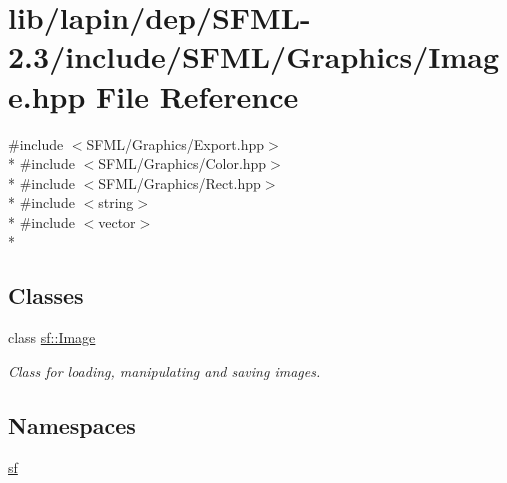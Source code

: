 \hypertarget{lapin_2dep_2_s_f_m_l-2_83_2include_2_s_f_m_l_2_graphics_2_image_8hpp}{\section{lib/lapin/dep/\-S\-F\-M\-L-\/2.3/include/\-S\-F\-M\-L/\-Graphics/\-Image.hpp File Reference}
\label{lapin_2dep_2_s_f_m_l-2_83_2include_2_s_f_m_l_2_graphics_2_image_8hpp}
}
{\ttfamily \#include $<$S\-F\-M\-L/\-Graphics/\-Export.\-hpp$>$}\\*
{\ttfamily \#include $<$S\-F\-M\-L/\-Graphics/\-Color.\-hpp$>$}\\*
{\ttfamily \#include $<$S\-F\-M\-L/\-Graphics/\-Rect.\-hpp$>$}\\*
{\ttfamily \#include $<$string$>$}\\*
{\ttfamily \#include $<$vector$>$}\\*
\subsection*{Classes}
\begin{DoxyCompactItemize}
\item 
class \hyperlink{classsf_1_1_image}{sf\-::\-Image}
\begin{DoxyCompactList}\small\item\em Class for loading, manipulating and saving images. \end{DoxyCompactList}\end{DoxyCompactItemize}
\subsection*{Namespaces}
\begin{DoxyCompactItemize}
\item 
\hyperlink{namespacesf}{sf}
\end{DoxyCompactItemize}
